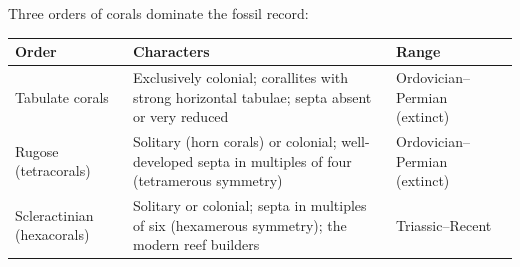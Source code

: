 \documentclass[11pt]{article}
\begin{document}
Three orders of corals dominate the fossil record:

\begin{tabularx}{\linewidth}{|l|X|X|}
\hline
\rowcolor{popblueL} \textbf{Order} & \textbf{Characters} & \textbf{Range} \\
\hline
Tabulate corals & Exclusively colonial; corallites with strong horizontal tabulae; septa absent or very reduced & Ordovician--Permian (extinct) \\
\hline
Rugose (tetracorals) & Solitary (horn corals) or colonial; well-developed septa in multiples of four (tetramerous symmetry) & Ordovician--Permian (extinct) \\
\hline
Scleractinian (hexacorals) & Solitary or colonial; septa in multiples of six (hexamerous symmetry); the modern reef builders & Triassic--Recent \\
\hline
\end{tabularx}
\end{document}
